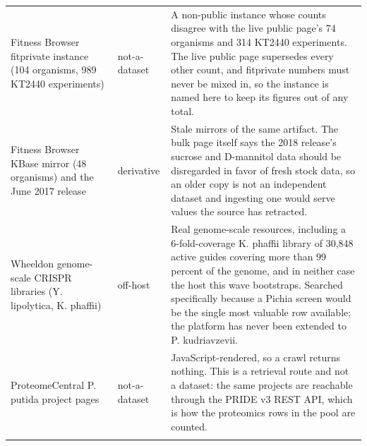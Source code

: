 \begin{longtable}{@{}L{58mm} L{26mm} L{88mm}@{}}
\addlinespace[5pt]
Fitness Browser fitprivate instance (104 organisms, 989 KT2440 experiments) & not-a-dataset & A non-public instance whose counts disagree with the live public page's 74 organisms and 314 KT2440 experiments. The live public page supersedes every other count, and fitprivate numbers must never be mixed in, so the instance is named here to keep its figures out of any total. \\
\addlinespace[5pt]
Fitness Browser KBase mirror (48 organisms) and the June 2017 release & derivative & Stale mirrors of the same artifact. The bulk page itself says the 2018 release's sucrose and D-mannitol data should be disregarded in favor of fresh stock data, so an older copy is not an independent dataset and ingesting one would serve values the source has retracted. \\
\addlinespace[5pt]
Wheeldon genome-scale CRISPR libraries (Y. lipolytica, K. phaffii) & off-host & Real genome-scale resources, including a 6-fold-coverage K. phaffii library of 30,848 active guides covering more than 99 percent of the genome, and in neither case the host this wave bootstraps. Searched specifically because a Pichia screen would be the single most valuable row available; the platform has never been extended to P. kudriavzevii. \\
\addlinespace[5pt]
ProteomeCentral P. putida project pages & not-a-dataset & JavaScript-rendered, so a crawl returns nothing. This is a retrieval route and not a dataset: the same projects are reachable through the PRIDE v3 REST API, which is how the proteomics rows in the pool are counted. \\
\addlinespace[5pt]
\end{longtable}
\endgroup
